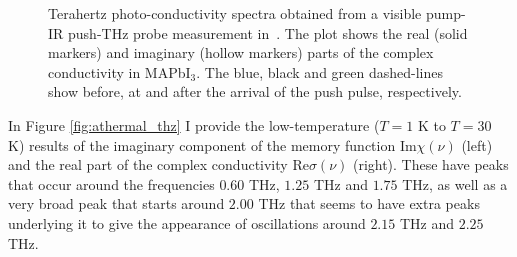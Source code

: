 \begin{figure}[t]
\caption{Terahertz photo-conductivity spectra obtained from a visible pump-IR push-THz probe measurement in~\cite{zheng_multipulse_2021}. The plot shows the real (solid markers) and imaginary (hollow markers) parts of the complex conductivity in MAPbI$_3$. The blue, black and green dashed-lines show before, at and after the arrival of the push pulse, respectively.}
\label{fig:thzplot}
\end{figure}

In Figure \ref{fig:athermal_thz} I provide the low-temperature ($T = 1$ 
K to $T = 30$ K) results of the imaginary component of the memory function $\text{Im}\chi(\nu)$ (left) and the real part of the complex conductivity $\text{Re}\sigma(\nu)$ (right). These have peaks that occur around the frequencies $0.60$ THz, $1.25$ THz and $1.75$ THz, as well as a very broad peak that starts around $2.00$ THz that seems to have extra peaks underlying it to give the appearance of oscillations around $2.15$ THz and $2.25$ THz. 

